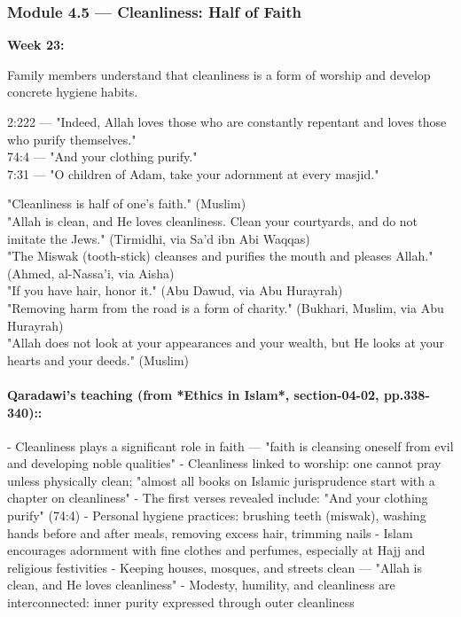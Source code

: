 \documentclass[11pt,a4paper]{article}
\begin{document}
\vspace{6pt}\noindent{\color{border}\rule{\textwidth}{0.5pt}}\vspace{6pt}

\subsubsection*{Module 4.5 --- Cleanliness: Half of Faith}
\textbf{Week 23:} 

\begin{outcomebox} Family members understand that cleanliness is a form of worship and develop concrete hygiene habits. \end{outcomebox}

\begin{quranbox} 2:222 --- "Indeed, Allah loves those who are constantly repentant and loves those who purify themselves." \\ 74:4 --- "And your clothing purify." \\ 7:31 --- "O children of Adam, take your adornment at every masjid." \end{quranbox}

\begin{hadithbox} "Cleanliness is half of one's faith." (Muslim) \\ "Allah is clean, and He loves cleanliness. Clean your courtyards, and do not imitate the Jews." (Tirmidhi, via Sa'd ibn Abi Waqqas) \\ "The Miswak (tooth-stick) cleanses and purifies the mouth and pleases Allah." (Ahmed, al-Nassa'i, via Aisha) \\ "If you have hair, honor it." (Abu Dawud, via Abu Hurayrah) \\ "Removing harm from the road is a form of charity." (Bukhari, Muslim, via Abu Hurayrah) \\ "Allah does not look at your appearances and your wealth, but He looks at your hearts and your deeds." (Muslim) \end{hadithbox}

\paragraph*{Qaradawi's teaching (from *Ethics in Islam*, section-04-02, pp.338-340)::}  - Cleanliness plays a significant role in faith --- "faith is cleansing oneself from evil and developing noble qualities" - Cleanliness linked to worship: one cannot pray unless physically clean; "almost all books on Islamic jurisprudence start with a chapter on cleanliness" - The first verses revealed include: "And your clothing purify" (74:4) - Personal hygiene practices: brushing teeth (miswak), washing hands before and after meals, removing excess hair, trimming nails - Islam encourages adornment with fine clothes and perfumes, especially at Hajj and religious festivities - Keeping houses, mosques, and streets clean --- "Allah is clean, and He loves cleanliness" - Modesty, humility, and cleanliness are interconnected: inner purity expressed through outer cleanliness
\end{document}
